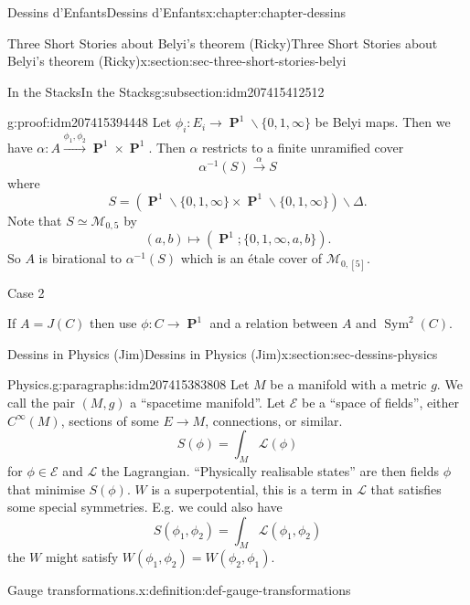 \documentclass[oneside,10pt,]{book}
\numberwithin{equation}{section}
\newcommand{\cinf}{C^\infty}
\newcommand{\inv}{^{-1}}
\newcommand{\lb}{[}
\newcommand{\rb}{]}
\DeclareMathOperator{\PP}{\mathbf{P}}
\DeclareMathOperator{\Sym}{Sym}
\begin{document}
\begin{chapterptx}{Dessins d'Enfants}{}{Dessins d'Enfants}{}{}{x:chapter:chapter-dessins}
\begin{sectionptx}{Three Short Stories about Belyi's theorem (Ricky)}{}{Three Short Stories about Belyi's theorem (Ricky)}{}{}{x:section:sec-three-short-stories-belyi}
\begin{subsectionptx}{In the Stacks}{}{In the Stacks}{}{}{g:subsection:idm207415412512}
\begin{proofptx}{}{g:proof:idm207415394448}
Let \(\phi_i \colon E_i \to \PP^1\smallsetminus \{0,1,\infty\}\) be Belyi maps. Then we have \(\alpha \colon A \xrightarrow{\phi_1,\phi_2} \PP^1 \times \PP^1\). Then \(\alpha\) restricts to a finite unramified cover%
\begin{equation*}
\alpha\inv (S) \xrightarrow \alpha S
\end{equation*}
where%
\begin{equation*}
S = (\PP^1 \smallsetminus \{0,1,\infty\} \times \PP^1 \smallsetminus \{0,1,\infty\}) \smallsetminus \Delta\text{.}
\end{equation*}
Note that \(S \simeq \mathcal M_{0,5}\) by%
\begin{equation*}
(a,b ) \mapsto (\PP^1; \{0,1,\infty, a,b\})\text{.}
\end{equation*}
So \(A\) is birational to \(\alpha\inv (S)\) which is an étale cover of \(\mathcal M_{0,\lb 5 \rb}\).%
\par
Case 2%
\par
If \(A = J(C)\) then use \(\phi \colon C \to \PP^1\) and a relation between \(A\) and \(\Sym^2(C)\).%
\end{proofptx}
\end{subsectionptx}
\end{sectionptx}
%
%
\typeout{************************************************}
\typeout{************************************************}
%
\begin{sectionptx}{Dessins in Physics (Jim)}{}{Dessins in Physics (Jim)}{}{}{x:section:sec-dessins-physics}
\begin{paragraphs}{Physics.}{g:paragraphs:idm207415383808}%
Let  \(M\)  be a manifold with  a metric \(g\). We call the pair \((M,g)\) a ``spacetime manifold''. Let \(\mathcal E\) be  a ``space of fields'', either \(\cinf (M)\), sections of some \(E\to M\), connections, or similar.%
\begin{equation*}
S(\phi) = \int_M \mathcal    L (\phi)
\end{equation*}
for \(\phi\in \mathcal E\) and \(\mathcal L\) the Lagrangian. ``Physically realisable states'' are then fields \(\phi\) that minimise \(S(\phi)\). \(W\) is a superpotential, this is a term in \(\mathcal L\) that satisfies some special symmetries. E.g. we could also have%
\begin{equation*}
S(\phi_1, \phi_2) = \int_M \mathcal L(\phi_1,\phi_2)
\end{equation*}
the \(W\) might satisfy \(W(\phi_1, \phi_2) = W(\phi_2, \phi_1)\).%
\begin{definition}{Gauge transformations.}{x:definition:def-gauge-transformations}%

\end{definition}
\end{paragraphs}
\end{sectionptx}
\end{chapterptx}
\end{document}

